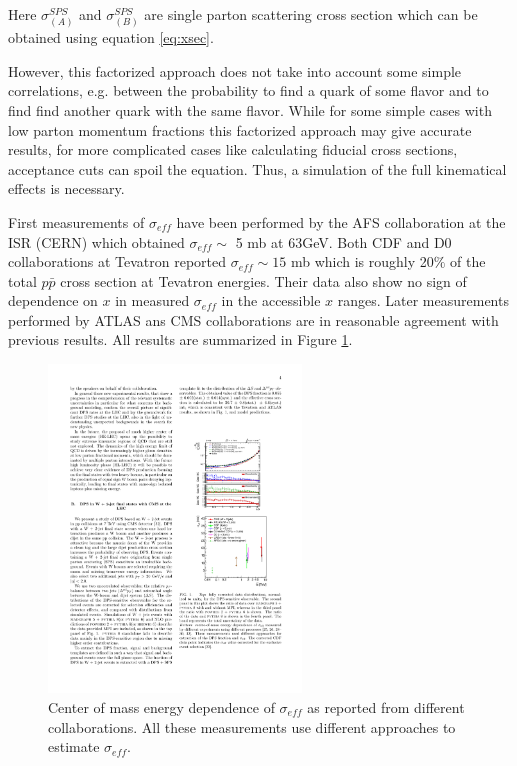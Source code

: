 Here $\sigma^{SPS}_{(A)}$ and $\sigma^{SPS}_{(B)}$ are single parton scattering cross section which can be obtained using equation \ref{eq:xsec}.
\par However, this factorized approach does not take into account some simple correlations, e.g. between the probability to find a quark of some flavor and to find find another quark with the same flavor. While for some simple cases with low parton momentum fractions this factorized approach may give accurate results, for more complicated cases like calculating fiducial cross sections, acceptance cuts can spoil the equation. Thus, a simulation of the full kinematical effects is necessary.
\par First measurements of $\sigma_{eff}$ have been performed by the AFS collaboration at the ISR (CERN) which obtained $\sigma_{eff} \sim$ 5 mb at 63GeV. Both CDF and D0 collaborations at Tevatron reported $\sigma_{eff} \sim 15$ mb which is roughly 20$\%$ of the total $p\bar{p}$ cross section at Tevatron energies. Their data also show no sign of dependence on $x$ in measured $\sigma_{eff}$  in the accessible $x$ ranges. Later measurements performed by ATLAS ans CMS collaborations are in reasonable agreement with previous results. All results are summarized in Figure \ref{fig:DPS_res}.
\begin{figure}[htbp]
	\centering
		\includegraphics[width=0.6\textwidth]{Figures/DPS_res.pdf}
	\caption[Results of $\sigma_{eff}$ measurements]{Center of mass energy dependence of $\sigma_{eff}$ as reported from different collaborations. All these measurements use different approaches to estimate $\sigma_{eff}$. \cite{Bansal:2014paa}}
	\label{fig:DPS_res}
\end{figure}
